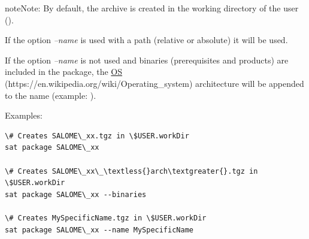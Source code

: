 \documentclass[a4paper,10pt,english]{sphinxmanual}
\begin{document}
\begin{notice}{note}{Note:}
By default, the archive is created in the working directory of the user ().

If the option \emph{--name} is used with a path (relative or absolute) it will be used.

If the option \emph{--name} is not used and binaries (prerequisites and products)
are included in the package, the \href{https://en.wikipedia.org/wiki/Operating\_system}{OS} (https://en.wikipedia.org/wiki/Operating\_system) architecture
will be appended to the name (example: ).

Examples:

\begin{Verbatim}[commandchars=\\\{\}]
\# Creates SALOME\_xx.tgz in \$USER.workDir
sat package SALOME\_xx

\# Creates SALOME\_xx\_\textless{}arch\textgreater{}.tgz in \$USER.workDir
sat package SALOME\_xx --binaries

\# Creates MySpecificName.tgz in \$USER.workDir
sat package SALOME\_xx --name MySpecificName
\end{Verbatim}
\end{notice}
\end{document}
